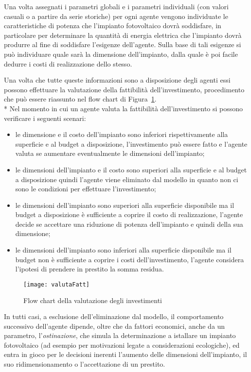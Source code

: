 \documentclass[12pt,a4paper,openright,twoside]{report}
\begin{document}
Una volta assegnati i parametri globali e i parametri individuali (con valori casuali o a partire da serie storiche) per ogni agente vengono individuate le caratteristiche di potenza che l'impianto fotovoltaico dovrà soddisfare, in particolare per determinare la quantità di energia elettrica che l'impianto dovrà produrre al fine di soddisfare l'esigenze dell'agente. Sulla base di tali esigenze si può individuare quale sarà la dimensione dell'impianto, dalla quale è poi facile dedurre i costi di realizzazione dello stesso.

Una volta che tutte queste informazioni sono a disposizione degli agenti essi possono effettuare la valutazione della fattibilità dell'investimento, procedimento che può essere riassunto nel flow chart di Figura~\ref{flowChartValFatt}.
\\*
Nel  momento in cui un agente valuta la fattibilità dell'investimento si possono verificare i seguenti scenari:
\begin{itemize}
\item le dimensione e il costo dell'impianto sono inferiori rispettivamente  alla superficie e al budget a disposizione, l'investimento può essere fatto e l'agente valuta se aumentare eventualmente le dimensioni dell'impianto;
\item le dimensioni dell'impianto e il costo sono superiori alla superficie e al budget a disposizione quindi l'agente viene eliminato dal modello in quanto non ci sono le condizioni per effettuare l'investimento;
\item le dimensioni dell'impianto sono superiori alla superficie disponibile ma il budget a disposizione è sufficiente a coprire il costo di realizzazione, l'agente decide se accettare una riduzione di potenza dell'impianto e quindi della sua dimensione;
\item le dimensioni dell'impianto sono inferiori alla superficie disponibile ma il budget non è sufficiente a coprire i costi dell'investimento, l'agente considera l'ipotesi di prendere in prestito la somma residua.
\end{itemize}

\begin{figure}[hbt]
	\centering
	\texttt{[image: valutaFatt]}
	\caption{Flow chart della valutazione degli investimenti}
	\label{flowChartValFatt}
\end{figure}

In tutti casi, a esclusione dell'eliminazione dal modello, il comportamento successivo dell'agente dipende, oltre che da fattori economici, anche da un parametro, l'\emph{ostinazione}, che simula la determinazione a istallare un impianto fotovoltaico (ad esempio per motivazioni legate a considerazioni ecologiche), ed entra in gioco per le decisioni inerenti l'aumento delle dimensioni dell'impianto, il suo ridimensionamento o l'accettazione di un prestito.
\end{document}
